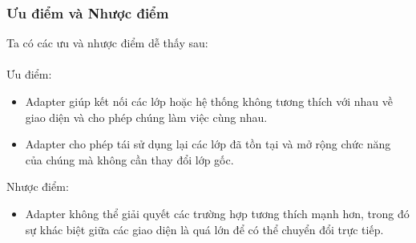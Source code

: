 \subsubsection{Ưu điểm và Nhược điểm}
Ta có các ưu và nhược điểm dễ thấy sau:\\\\
Ưu điểm:
\begin{itemize}
    \item Adapter giúp kết nối các lớp hoặc hệ thống không tương thích với nhau về giao diện và cho phép chúng làm việc cùng nhau.
    \item Adapter cho phép tái sử dụng lại các lớp đã tồn tại và mở rộng chức năng của chúng mà không cần thay đổi lớp gốc.
\end{itemize}
Nhược điểm:
\begin{itemize}
    \item Adapter không thể giải quyết các trường hợp tương thích mạnh hơn, trong đó sự khác biệt giữa các giao diện là quá lớn để có thể chuyển đổi trực tiếp.
\end{itemize}
